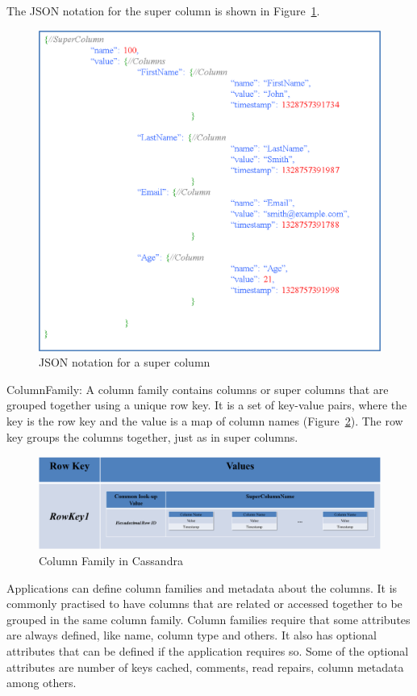 \begin{description}
The JSON notation for the super column is shown in Figure~\ref{f:supercolumn-JSON}. 

\begin{figure}[H]
	\centering
	\includegraphics[width=.7\textwidth]{./figure/Example/JSON_SuperColumn_John.png}
	\caption{JSON notation for a super column}\label{f:supercolumn-JSON}
\end{figure}

\item ColumnFamily: A column family contains columns or super columns that are
grouped together using a unique row key.  It is a set of key-value
pairs,   where the key is the row key and the value is a map of column names
(Figure~\ref{f:columnfamily}).  The row key groups the columns together,   just as
in super columns. 

\begin{figure}[H]
	\centering
	\includegraphics[width=.8\textwidth]{./figure/Example/ColumnFamily.png}
	\caption{Column Family in Cassandra}\label{f:columnfamily}
\end{figure}

Applications can define column families and metadata about the columns. 
It is commonly practised to have columns that are related or accessed
together to be grouped in the same column family.  Column families require that
some attributes are always defined,   like name,   column type and others.  It also
has optional attributes that can be defined if the application requires so.  Some of the optional
attributes are number of keys cached,   comments,   read repairs,   column
metadata among others. 


\end{description}
